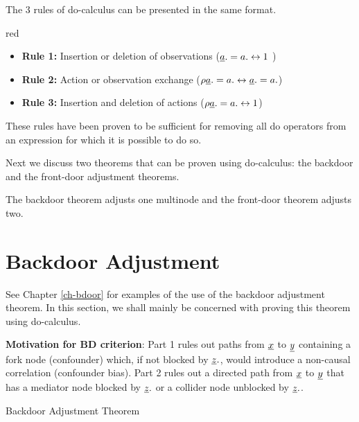 The 3 rules of do-calculus
can be presented in the same
format. 


\begin{color}{red}
\begin{itemize}
\item {\bf Rule 1:} 
Insertion or deletion of
 observations 
(${\underline{a}}.=a. \leftrightarrow 1$ )


\item {\bf Rule 2:} Action or 
observation exchange 
($\rho {\underline{a}}.=a. \leftrightarrow {\underline{a}}.=a.$)


\item {\bf Rule 3:} Insertion and
 deletion of actions
($\rho {\underline{a}}.=a. \leftrightarrow 1$)



\end{itemize}
\end{color}

These rules have been
proven to be 
sufficient
for removing
all do operators
from an expression
for 
which it 
is possible to do so.

Next we discuss
two theorems that can be
proven using
do-calculus:
the backdoor and the
front-door
adjustment theorems.

The 
backdoor theorem 
adjusts one multinode
and the 
front-door theorem adjusts two.


\section*{Backdoor Adjustment}

See Chapter \ref{ch-bdoor}
for examples of the use of the 
backdoor adjustment theorem.
In this section,
we shall mainly be
concerned with
proving this
theorem
using do-calculus.



\bdoordef

{\bf Motivation for BD criterion}: 
Part 1 rules out
paths 
from ${\underline{x}}$
to ${\underline{y}}$
containing a fork node (confounder)
which, if not blocked by ${\underline{z}}.$, 
 would introduce a
non-causal correlation 
(confounder bias).
Part 2 rules out
a directed path
from ${\underline{x}}$ to ${\underline{y}}$
that has a mediator node
blocked by ${\underline{z}}.$
or a collider node
unblocked by ${\underline{z}}.$.



\begin{claim} Backdoor Adjustment Theorem

\bdoorclaim
\end{claim}
\proof

